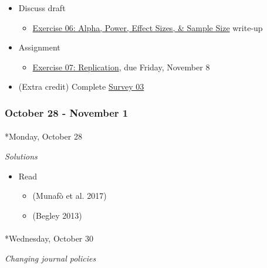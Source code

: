 \documentclass[
  letterpaper,
  DIV=11,
  numbers=noendperiod]{scrartcl}
\makeatletter
\let\oldparagraph\paragraph
\renewcommand{\paragraph}{
    \@ifstar
      \xxxParagraphStar
      \xxxParagraphNoStar
  }
\newcommand{\xxxParagraphStar}[1]{\oldparagraph*{#1}\mbox{}}
\newcommand{\xxxParagraphNoStar}[1]{\oldparagraph{#1}\mbox{}}
\providecommand{\tightlist}{%
  \setlength{\itemsep}{0pt}\setlength{\parskip}{0pt}}\usepackage{longtable,booktabs,array}
\makeatother
\begin{document}
\begin{itemize}
\tightlist
\item
  {Discuss draft}

  \begin{itemize}
  \tightlist
  \item
    \href{exercises/ex06-apes.qmd}{Exercise 06: Alpha, Power, Effect
    Sizes, \& Sample Size} write-up
  \end{itemize}
\item
  {Assignment}

  \begin{itemize}
  \tightlist
  \item
    \href{exercises/ex07-replication.qmd}{Exercise 07: Replication},
    {due Friday, November 8}
  \end{itemize}
\item
  (Extra credit) Complete
  \href{https://forms.gle/BTqayMKnP7Xnyhst9}{Survey 03}
\end{itemize}

\subsubsection*{October 28 - November 1}\label{week-10}

\paragraph*{Monday, October 28}\label{monday-october-28}

\emph{Solutions}

\begin{itemize}
\tightlist
\item
  Read

  \begin{itemize}
  \tightlist
  \item
    (Munafò et al. 2017)
  \item
    (Begley 2013)
  \end{itemize}
\end{itemize}

\paragraph*{Wednesday, October 30}\label{wednesday-october-30}

\emph{Changing journal policies}
\end{document}
